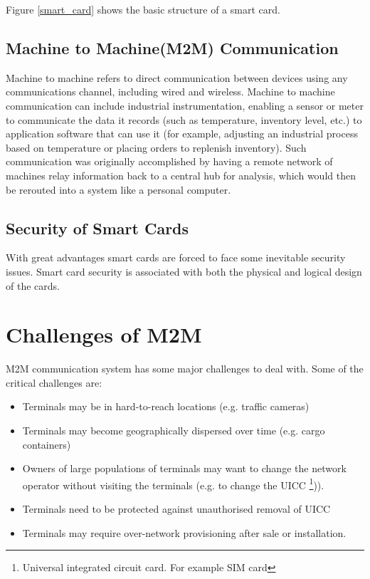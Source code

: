 \documentclass[12pt]{article}
\begin{document}
Figure \ref{smart_card} shows the basic structure of a smart card. 


\subsection{Machine to Machine(M2M) Communication}
Machine to machine refers to direct communication between devices using any communications channel, including wired and wireless. Machine to machine communication can include industrial instrumentation, enabling a sensor or meter to communicate the data it records (such as temperature, inventory level, etc.) to application software that can use it (for example, adjusting an industrial process based on temperature or placing orders to replenish inventory). Such communication was originally accomplished by having a remote network of machines relay information back to a central hub for analysis, which would then be rerouted into a system like a personal computer. 

\subsection{Security of Smart Cards}
With great advantages smart cards are forced to face some inevitable security issues. Smart card security is associated with both the physical and logical design of the cards. 

\section{Challenges of M2M}
M2M communication system has some major challenges to deal with. Some of the critical challenges are:

\begin{itemize}
\item Terminals may be in hard-to-reach locations (e.g. traffic cameras)
\item Terminals may become geographically dispersed over time (e.g. cargo containers)
\item Owners of large populations of terminals may want to change the network
operator without visiting the terminals (e.g. to change the UICC \footnote{Universal integrated circuit card. For example SIM card})).
\item Terminals need to be protected against unauthorised removal of UICC
\item Terminals may require over-network provisioning after sale or installation.
\end{itemize}
\end{document}
